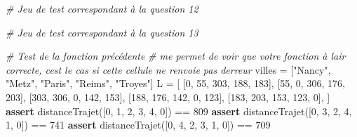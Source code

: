 \documentclass[
  paper=a4,
  ,captions=tableheading
]{scrartcl}
\newenvironment{Shaded}{}{}
\newcommand{\CommentTok}[1]{\textcolor[rgb]{0.38,0.63,0.69}{\textit{#1}}}
\newcommand{\ControlFlowTok}[1]{\textcolor[rgb]{0.00,0.44,0.13}{\textbf{#1}}}
\newcommand{\DecValTok}[1]{\textcolor[rgb]{0.25,0.63,0.44}{#1}}
\newcommand{\NormalTok}[1]{#1}
\newcommand{\OperatorTok}[1]{\textcolor[rgb]{0.40,0.40,0.40}{#1}}
\newcommand{\StringTok}[1]{\textcolor[rgb]{0.25,0.44,0.63}{#1}}
\begin{document}
\begin{Shaded}
\begin{Highlighting}[]
\CommentTok{\# Jeu de test correspondant à la question 12}
\end{Highlighting}
\end{Shaded}

\begin{Shaded}
\begin{Highlighting}[]
\CommentTok{\# Jeu de test correspondant à la question 13}
\end{Highlighting}
\end{Shaded}

\begin{Shaded}
\begin{Highlighting}[]
\CommentTok{\# Test de la fonction précédente}
\CommentTok{\# me permet de voir que votre fonction à l\textquotesingle{}air correcte, c\textquotesingle{}est le cas si cette cellule ne renvoie pas d\textquotesingle{}erreur}
\NormalTok{villes }\OperatorTok{=}\NormalTok{ [}\StringTok{"Nancy"}\NormalTok{, }\StringTok{"Metz"}\NormalTok{, }\StringTok{"Paris"}\NormalTok{, }\StringTok{"Reims"}\NormalTok{, }\StringTok{"Troyes"}\NormalTok{]}
\NormalTok{L }\OperatorTok{=}\NormalTok{ [}
\NormalTok{    [}\DecValTok{0}\NormalTok{, }\DecValTok{55}\NormalTok{, }\DecValTok{303}\NormalTok{, }\DecValTok{188}\NormalTok{, }\DecValTok{183}\NormalTok{],}
\NormalTok{    [}\DecValTok{55}\NormalTok{, }\DecValTok{0}\NormalTok{, }\DecValTok{306}\NormalTok{, }\DecValTok{176}\NormalTok{, }\DecValTok{203}\NormalTok{],}
\NormalTok{    [}\DecValTok{303}\NormalTok{, }\DecValTok{306}\NormalTok{, }\DecValTok{0}\NormalTok{, }\DecValTok{142}\NormalTok{, }\DecValTok{153}\NormalTok{],}
\NormalTok{    [}\DecValTok{188}\NormalTok{, }\DecValTok{176}\NormalTok{, }\DecValTok{142}\NormalTok{, }\DecValTok{0}\NormalTok{, }\DecValTok{123}\NormalTok{],}
\NormalTok{    [}\DecValTok{183}\NormalTok{, }\DecValTok{203}\NormalTok{, }\DecValTok{153}\NormalTok{, }\DecValTok{123}\NormalTok{, }\DecValTok{0}\NormalTok{],}
\NormalTok{]}
\ControlFlowTok{assert}\NormalTok{ distanceTrajet([}\DecValTok{0}\NormalTok{, }\DecValTok{1}\NormalTok{, }\DecValTok{2}\NormalTok{, }\DecValTok{3}\NormalTok{, }\DecValTok{4}\NormalTok{, }\DecValTok{0}\NormalTok{]) }\OperatorTok{==} \DecValTok{809}
\ControlFlowTok{assert}\NormalTok{ distanceTrajet([}\DecValTok{0}\NormalTok{, }\DecValTok{3}\NormalTok{, }\DecValTok{2}\NormalTok{, }\DecValTok{4}\NormalTok{, }\DecValTok{1}\NormalTok{, }\DecValTok{0}\NormalTok{]) }\OperatorTok{==} \DecValTok{741}
\ControlFlowTok{assert}\NormalTok{ distanceTrajet([}\DecValTok{0}\NormalTok{, }\DecValTok{4}\NormalTok{, }\DecValTok{2}\NormalTok{, }\DecValTok{3}\NormalTok{, }\DecValTok{1}\NormalTok{, }\DecValTok{0}\NormalTok{]) }\OperatorTok{==} \DecValTok{709}
\end{Highlighting}
\end{Shaded}
\end{document}
